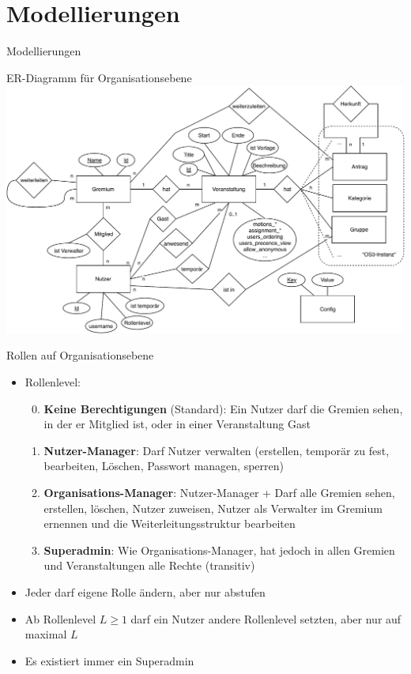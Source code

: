 \documentclass[10pt]{beamer}
\begin{document}
\section{Modellierungen}
\begin{frame}
	\begin{center}
		Modellierungen
	\end{center}
\end{frame}
\begin{frame}{ER-Diagramm für Organisationsebene}
	\includegraphics[scale=0.5]{modellierung}
\end{frame}
\begin{frame}{Rollen auf Organisationsebene}
	\begin{itemize}
		\item Rollenlevel:
		\begin{enumerate}
			\setcounter{enumi}{-1}
			\item \textbf{Keine Berechtigungen} (Standard): Ein Nutzer darf die Gremien sehen, in der er Mitglied ist, oder in einer Veranstaltung Gast
			\item \textbf{Nutzer-Manager}: Darf Nutzer verwalten (erstellen, temporär zu fest, bearbeiten, Löschen, Passwort managen, sperren)
			\item \textbf{Organisations-Manager}: Nutzer-Manager + Darf alle Gremien sehen, erstellen, löschen, Nutzer zuweisen, Nutzer als Verwalter im Gremium ernennen und die Weiterleitungsstruktur bearbeiten
			\item \textbf{Superadmin}: Wie Organisations-Manager, hat jedoch in allen Gremien und Veranstaltungen alle Rechte (transitiv)
		\end{enumerate}
		\item<2-> Jeder darf eigene Rolle ändern, aber nur abstufen
		\item<3-> Ab Rollenlevel $L\geq1$ darf ein Nutzer andere Rollenlevel setzten, aber nur auf maximal $L$
		\item<4-> Es existiert immer ein Superadmin
	\end{itemize}
\end{frame}
\end{document}
